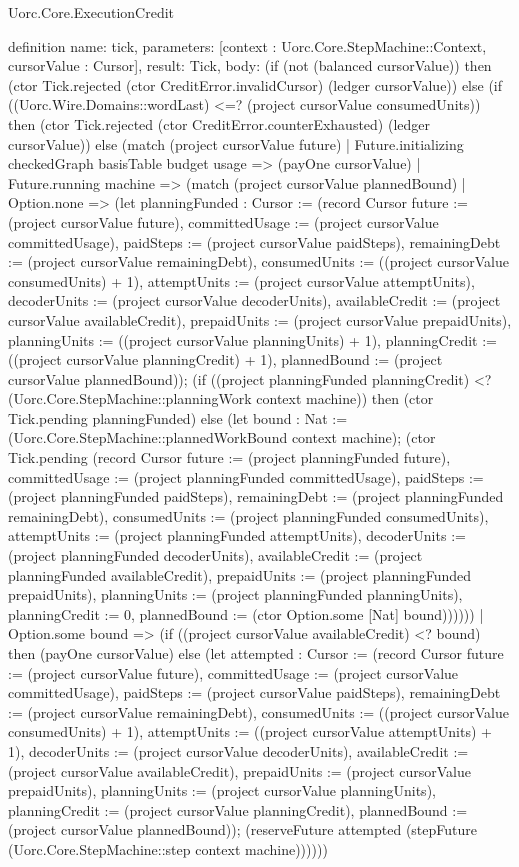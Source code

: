 \begin{lexlean}{Uorc.Core.ExecutionCredit}
\begin{semanticmodule}
definition{
  name: tick,
  parameters: [context : Uorc.Core.StepMachine::Context, cursorValue : Cursor],
  result: Tick,
  body: (if (not (balanced cursorValue)) then (ctor Tick.rejected (ctor CreditError.invalidCursor) (ledger cursorValue)) else (if ((Uorc.Wire.Domains::wordLast) <=? (project cursorValue consumedUnits)) then (ctor Tick.rejected (ctor CreditError.counterExhausted) (ledger cursorValue)) else (match (project cursorValue future)
    | Future.initializing checkedGraph basisTable budget usage => (payOne cursorValue)
    | Future.running machine => (match (project cursorValue plannedBound)
      | Option.none => (let planningFunded : Cursor := (record Cursor {future := (project cursorValue future), committedUsage := (project cursorValue committedUsage), paidSteps := (project cursorValue paidSteps), remainingDebt := (project cursorValue remainingDebt), consumedUnits := ((project cursorValue consumedUnits) + 1), attemptUnits := (project cursorValue attemptUnits), decoderUnits := (project cursorValue decoderUnits), availableCredit := (project cursorValue availableCredit), prepaidUnits := (project cursorValue prepaidUnits), planningUnits := ((project cursorValue planningUnits) + 1), planningCredit := ((project cursorValue planningCredit) + 1), plannedBound := (project cursorValue plannedBound)}); (if ((project planningFunded planningCredit) <? (Uorc.Core.StepMachine::planningWork context machine)) then (ctor Tick.pending planningFunded) else (let bound : Nat := (Uorc.Core.StepMachine::plannedWorkBound context machine); (ctor Tick.pending (record Cursor {future := (project planningFunded future), committedUsage := (project planningFunded committedUsage), paidSteps := (project planningFunded paidSteps), remainingDebt := (project planningFunded remainingDebt), consumedUnits := (project planningFunded consumedUnits), attemptUnits := (project planningFunded attemptUnits), decoderUnits := (project planningFunded decoderUnits), availableCredit := (project planningFunded availableCredit), prepaidUnits := (project planningFunded prepaidUnits), planningUnits := (project planningFunded planningUnits), planningCredit := 0, plannedBound := (ctor Option.some [Nat] bound)})))))
      | Option.some bound => (if ((project cursorValue availableCredit) <? bound) then (payOne cursorValue) else (let attempted : Cursor := (record Cursor {future := (project cursorValue future), committedUsage := (project cursorValue committedUsage), paidSteps := (project cursorValue paidSteps), remainingDebt := (project cursorValue remainingDebt), consumedUnits := ((project cursorValue consumedUnits) + 1), attemptUnits := ((project cursorValue attemptUnits) + 1), decoderUnits := (project cursorValue decoderUnits), availableCredit := (project cursorValue availableCredit), prepaidUnits := (project cursorValue prepaidUnits), planningUnits := (project cursorValue planningUnits), planningCredit := (project cursorValue planningCredit), plannedBound := (project cursorValue plannedBound)}); (reserveFuture attempted (stepFuture (Uorc.Core.StepMachine::step context machine))))))
}
\end{semanticmodule}
\end{lexlean}
